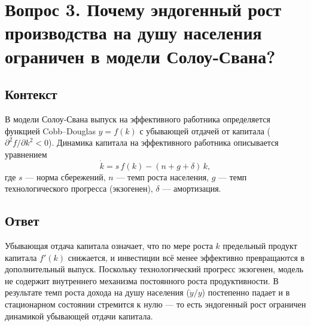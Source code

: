 \section*{Вопрос 3. Почему эндогенный рост производства на душу населения ограничен в модели Солоу‑Свана?}

\subsection*{Контекст}
В модели Солоу‑Свана выпуск на эффективного работника определяется функцией Cobb–Douglas \(y=f(k)\) с убывающей 
отдачей от капитала (\(\partial^2 f/\partial k^2<0\)). Динамика капитала на эффективного работника описывается уравнением
\[
\dot k = s\,f(k) - (n + g + \delta)\,k,
\]
где \(s\) — норма сбережений, \(n\) — темп роста населения, \(g\) — темп технологического прогресса (экзогенен), \(\delta\) — 
амортизация.

\subsection*{Ответ}
Убывающая отдача капитала означает, что по мере роста \(k\) предельный продукт капитала \(f'(k)\) снижается, и инвестиции всё менее 
эффективно превращаются в дополнительный выпуск. Поскольку технологический прогресс экзогенен, модель не содержит 
внутреннего механизма постоянного роста продуктивности. В результате темп роста дохода на душу населения (\(\dot y/y\))
 постепенно падает и в стационарном состоянии стремится к нулю — то есть эндогенный рост ограничен динамикой убывающей отдачи капитала.
